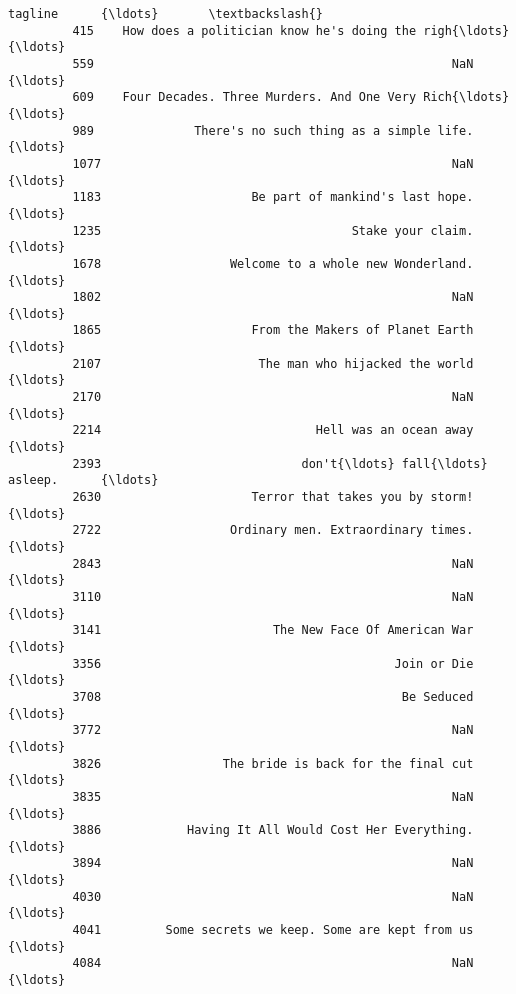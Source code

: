 \documentclass[11pt]{article}
\begin{document}
\begin{Verbatim}[commandchars=\\\{\}]
                                                          tagline      {\ldots}       \textbackslash{}
         415    How does a politician know he's doing the righ{\ldots}      {\ldots}        
         559                                                  NaN      {\ldots}        
         609    Four Decades. Three Murders. And One Very Rich{\ldots}      {\ldots}        
         989              There's no such thing as a simple life.      {\ldots}        
         1077                                                 NaN      {\ldots}        
         1183                     Be part of mankind's last hope.      {\ldots}        
         1235                                   Stake your claim.      {\ldots}        
         1678                  Welcome to a whole new Wonderland.      {\ldots}        
         1802                                                 NaN      {\ldots}        
         1865                     From the Makers of Planet Earth      {\ldots}        
         2107                      The man who hijacked the world      {\ldots}        
         2170                                                 NaN      {\ldots}        
         2214                              Hell was an ocean away      {\ldots}        
         2393                            don't{\ldots} fall{\ldots} asleep.      {\ldots}        
         2630                     Terror that takes you by storm!      {\ldots}        
         2722                  Ordinary men. Extraordinary times.      {\ldots}        
         2843                                                 NaN      {\ldots}        
         3110                                                 NaN      {\ldots}        
         3141                        The New Face Of American War      {\ldots}        
         3356                                         Join or Die      {\ldots}        
         3708                                          Be Seduced      {\ldots}        
         3772                                                 NaN      {\ldots}        
         3826                 The bride is back for the final cut      {\ldots}        
         3835                                                 NaN      {\ldots}        
         3886            Having It All Would Cost Her Everything.      {\ldots}        
         3894                                                 NaN      {\ldots}        
         4030                                                 NaN      {\ldots}        
         4041         Some secrets we keep. Some are kept from us      {\ldots}        
         4084                                                 NaN      {\ldots}        

\end{Verbatim}
\end{document}
